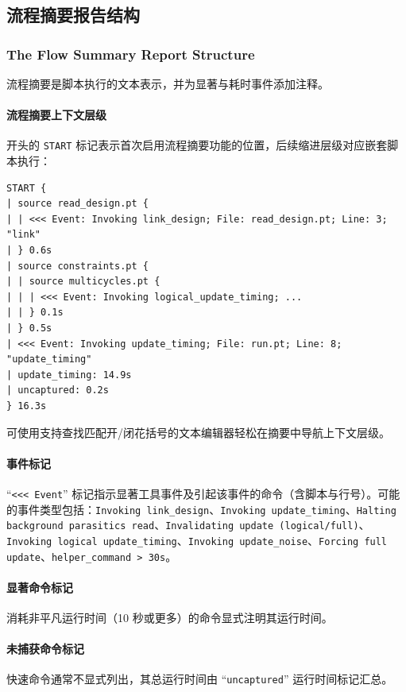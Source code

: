 \subsection{流程摘要报告结构}
\subsubsection*{The Flow Summary Report Structure}

流程摘要是脚本执行的文本表示，并为显著与耗时事件添加注释。

\paragraph{流程摘要上下文层级}
开头的 \texttt{START} 标记表示首次启用流程摘要功能的位置，后续缩进层级对应嵌套脚本执行：
\begin{lstlisting}
START {
| source read_design.pt {
| | <<< Event: Invoking link_design; File: read_design.pt; Line: 3; "link"
| } 0.6s
| source constraints.pt {
| | source multicycles.pt {
| | | <<< Event: Invoking logical_update_timing; ...
| | } 0.1s
| } 0.5s
| <<< Event: Invoking update_timing; File: run.pt; Line: 8; "update_timing"
| update_timing: 14.9s
| uncaptured: 0.2s
} 16.3s
\end{lstlisting}

可使用支持查找匹配开/闭花括号的文本编辑器轻松在摘要中导航上下文层级。

\paragraph{事件标记}
``\texttt{<<< Event}'' 标记指示显著工具事件及引起该事件的命令（含脚本与行号）。可能的事件类型包括：\texttt{Invoking link\_design}、\texttt{Invoking update\_timing}、\texttt{Halting background parasitics read}、\texttt{Invalidating update (logical/full)}、\texttt{Invoking logical update\_timing}、\texttt{Invoking update\_noise}、\texttt{Forcing full update}、\texttt{helper\_command > 30s}。

\paragraph{显著命令标记}
消耗非平凡运行时间（10 秒或更多）的命令显式注明其运行时间。

\paragraph{未捕获命令标记}
快速命令通常不显式列出，其总运行时间由 ``\texttt{uncaptured}'' 运行时间标记汇总。


